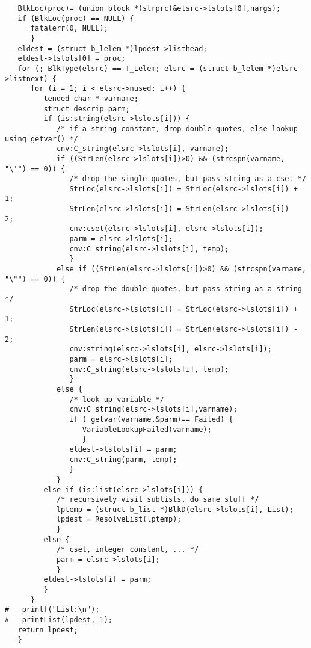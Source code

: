 \documentclass{article}
\begin{document}
\begin{verbatim}
   BlkLoc(proc)= (union block *)strprc(&elsrc->lslots[0],nargs);
   if (BlkLoc(proc) == NULL) {
      fatalerr(0, NULL);
      }
   eldest = (struct b_lelem *)lpdest->listhead;
   eldest->lslots[0] = proc;
   for (; BlkType(elsrc) == T_Lelem; elsrc = (struct b_lelem *)elsrc->listnext) {
      for (i = 1; i < elsrc->nused; i++) {
         tended char * varname;
         struct descrip parm;
         if (is:string(elsrc->lslots[i])) {
            /* if a string constant, drop double quotes, else lookup using getvar() */
            cnv:C_string(elsrc->lslots[i], varname);
            if ((StrLen(elsrc->lslots[i])>0) && (strcspn(varname, "\'") == 0)) {
               /* drop the single quotes, but pass string as a cset */
               StrLoc(elsrc->lslots[i]) = StrLoc(elsrc->lslots[i]) + 1;
               StrLen(elsrc->lslots[i]) = StrLen(elsrc->lslots[i]) - 2;
               cnv:cset(elsrc->lslots[i], elsrc->lslots[i]);
               parm = elsrc->lslots[i];
               cnv:C_string(elsrc->lslots[i], temp);
               }
            else if ((StrLen(elsrc->lslots[i])>0) && (strcspn(varname, "\"") == 0)) {
               /* drop the double quotes, but pass string as a string */
               StrLoc(elsrc->lslots[i]) = StrLoc(elsrc->lslots[i]) + 1;
               StrLen(elsrc->lslots[i]) = StrLen(elsrc->lslots[i]) - 2;
               cnv:string(elsrc->lslots[i], elsrc->lslots[i]);
               parm = elsrc->lslots[i];
               cnv:C_string(elsrc->lslots[i], temp);
               }
            else {
               /* look up variable */
               cnv:C_string(elsrc->lslots[i],varname);
               if ( getvar(varname,&parm)== Failed) {
                  VariableLookupFailed(varname);
                  }
               eldest->lslots[i] = parm;
               cnv:C_string(parm, temp);
               }
            }
         else if (is:list(elsrc->lslots[i])) {
            /* recursively visit sublists, do same stuff */
            lptemp = (struct b_list *)BlkD(elsrc->lslots[i], List);
            lpdest = ResolveList(lptemp);
            }
         else { 
            /* cset, integer constant, ... */
            parm = elsrc->lslots[i];
            }
         eldest->lslots[i] = parm;
         }
      }
#   printf("List:\n");
#   printList(lpdest, 1);
   return lpdest;
   }
\end{verbatim}
\end{document}
